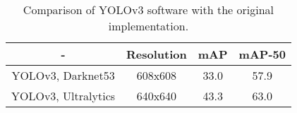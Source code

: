\begin{table}[!tb]
    \centering
    \caption[Comparison of YOLOv3 software with the original implementation]
    {Comparison of YOLOv3 software with the original implementation.}
     \begin{tabular}{||c | c | c c||} 
     \hline
      - & Resolution & mAP & mAP-50 \\ [0.5ex]
     \hline\hline
      YOLOv3, Darknet53 & 608x608 & 33.0 & 57.9\\ 
     \hline
     YOLOv3, Ultralytics & 640x640 & 43.3 & 63.0 \\
     \hline
    \end{tabular}
    \label{tab:yolov3_comparison}
\end{table}